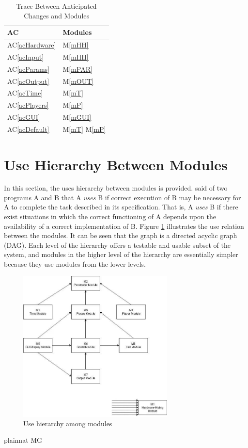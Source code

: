 \documentclass[12pt, titlepage]{article}
\newcommand{\acref}[1]{AC\ref{#1}}
\newcommand{\mref}[1]{M\ref{#1}}
\begin{document}
\begin{table}[H]
\centering
\begin{tabular}{p{} p{}}
\toprule
\textbf{AC} & \textbf{Modules}\\
\midrule

\acref{acHardware} & \mref{mHH}\\
\acref{acInput} & \mref{mHH}\\
\acref{acParams} & \mref{mPAR}\\
\acref{acOutput} & \mref{mOUT}\\
\acref{acTime} & \mref{mT}\\
\acref{acPlayers} & \mref{mP}\\
\acref{acGUI} & \mref{mGUI}\\
\acref{acDefault} & \mref{mT} \mref{mP}\\

\bottomrule
\end{tabular}
\caption{Trace Between Anticipated Changes and Modules}
\label{TblACT}
\end{table}

\section{Use Hierarchy Between Modules} \label{SecUse}

In this section, the uses hierarchy between modules is
provided. \citet{Parnas1978} said of two programs A and B that A {\em uses} B if
correct execution of B may be necessary for A to complete the task described in
its specification. That is, A {\em uses} B if there exist situations in which
the correct functioning of A depends upon the availability of a correct
implementation of B.  Figure \ref{FigUH} illustrates the use relation between
the modules. It can be seen that the graph is a directed acyclic graph
(DAG). Each level of the hierarchy offers a testable and usable subset of the
system, and modules in the higher level of the hierarchy are essentially simpler
because they use modules from the lower levels.

\begin{figure}[H]
\centering
\includegraphics[width=0.7\textwidth]{UsesHierarchy.png}
\caption{Use hierarchy among modules}
\label{FigUH}
\end{figure}


 {plainnat}
 {MG}
\end{document}

